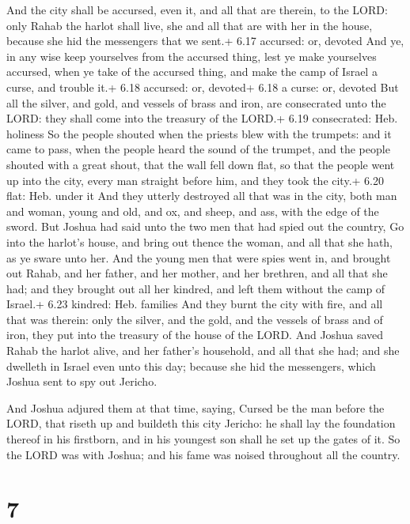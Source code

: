  And the city shall be accursed, even it, and all that
are therein, to the LORD: only Rahab the harlot shall live, she and all
that are with her in the house, because she hid the messengers that we
sent.+ 6.17 accursed: or, devoted  And ye, in any wise keep
yourselves from the accursed thing, lest ye make yourselves accursed,
when ye take of the accursed thing, and make the camp of Israel a curse,
and trouble it.+ 6.18 accursed: or, devoted+ 6.18 a curse: or, devoted
 But all the silver, and gold, and vessels of brass and
iron, are consecrated unto the LORD: they shall come into the treasury
of the LORD.+ 6.19 consecrated: Heb. holiness  So the
people shouted when the priests blew with the trumpets: and it came to
pass, when the people heard the sound of the trumpet, and the people
shouted with a great shout, that the wall fell down flat, so that the
people went up into the city, every man straight before him, and they
took the city.+ 6.20 flat: Heb. under it  And they utterly
destroyed all that was in the city, both man and woman, young and old,
and ox, and sheep, and ass, with the edge of the sword. 
But Joshua had said unto the two men that had spied out the country, Go
into the harlot's house, and bring out thence the woman, and all that
she hath, as ye sware unto her.  And the young men that
were spies went in, and brought out Rahab, and her father, and her
mother, and her brethren, and all that she had; and they brought out all
her kindred, and left them without the camp of Israel.+ 6.23 kindred:
Heb. families  And they burnt the city with fire, and all
that was therein: only the silver, and the gold, and the vessels of
brass and of iron, they put into the treasury of the house of the LORD.
 And Joshua saved Rahab the harlot alive, and her father's
household, and all that she had; and she dwelleth in Israel even unto
this day; because she hid the messengers, which Joshua sent to spy out
Jericho.

 And Joshua adjured them at that time, saying, Cursed be
the man before the LORD, that riseth up and buildeth this city Jericho:
he shall lay the foundation thereof in his firstborn, and in his
youngest son shall he set up the gates of it.  So the LORD
was with Joshua; and his fame was noised throughout all the country.

\hypertarget{section-6}{%
\section{7}\label{section-6}}

